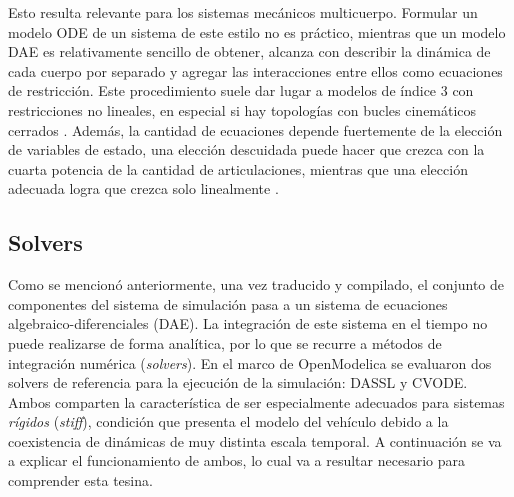 Esto resulta relevante para los sistemas mecánicos multicuerpo. Formular un modelo ODE de un sistema de este estilo no es práctico, mientras que un modelo DAE es relativamente sencillo de obtener, alcanza con describir la dinámica de cada cuerpo por separado y agregar las interacciones entre ellos como ecuaciones de restricción. Este procedimiento suele dar lugar a modelos de índice $3$ con restricciones no lineales, en especial si hay topologías con bucles cinemáticos cerrados \cite{cellier2006}. Además, la cantidad de ecuaciones depende fuertemente de la elección de variables de estado, una elección descuidada puede hacer que crezca con la cuarta potencia de la cantidad de articulaciones, mientras que una elección adecuada logra que crezca solo linealmente \cite{cellier2006}.\\


\subsection{Solvers}

Como se mencionó anteriormente, una vez traducido y compilado, el conjunto de componentes del sistema de simulación pasa a un sistema de ecuaciones algebraico-diferenciales (DAE). La integración de este sistema en el tiempo no puede realizarse de forma analítica, por lo que se recurre a métodos de integración numérica (\textit{solvers}). En el marco de OpenModelica se evaluaron dos solvers de referencia para la ejecución de la simulación: DASSL y CVODE. Ambos comparten la característica de ser especialmente adecuados para sistemas \textit{rígidos} (\textit{stiff}), condición que presenta el modelo del vehículo debido a la coexistencia de dinámicas de muy distinta escala temporal. A continuación se va a explicar el funcionamiento de ambos, lo cual va a resultar necesario para comprender esta tesina.

